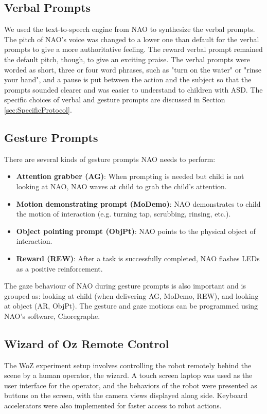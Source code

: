 \subsection{Verbal Prompts}
We used the text-to-speech engine from NAO to synthesize the verbal prompts.  The pitch of NAO's voice was changed to a lower one than default for the verbal prompts to give a more authoritative feeling.  The reward verbal prompt remained the default pitch, though, to give an exciting praise.  The verbal prompts were worded as short, three or four word phrases, such as "turn on the water" or "rinse your hand", and a pause is put between the action and the subject so that the prompts sounded clearer and was easier to understand to children with ASD.  The specific choices of verbal and gesture prompts are discussed in Section \ref{sec:SpecificProtocol}.

\subsection{Gesture Prompts}
There are several kinds of gesture prompts NAO needs to perform:

\begin{itemize}
	\item \textbf{Attention grabber (AG)}:  When prompting is needed but child is not looking at NAO, NAO waves at child to grab the child’s attention.
	\item \textbf{Motion demonstrating prompt (MoDemo)}:  NAO demonstrates to child the motion of interaction (e.g. turning tap, scrubbing, rinsing, etc.).
	\item \textbf{Object pointing prompt (ObjPt)}:  NAO points to the physical object of interaction.
	\item \textbf{Reward (REW)}:  After a task is successfully completed, NAO flashes LEDs as a positive reinforcement.
\end{itemize}

The gaze behaviour of NAO during gesture prompts is also important and is grouped as: looking at child (when delivering AG, MoDemo, REW), and looking at object (AR, ObjPt).  The gesture and gaze motions can be programmed using NAO's software, Choregraphe.

\subsection{Wizard of Oz Remote Control}
The WoZ experiment setup involves controlling the robot remotely behind the scene by a human operator, the wizard.  A touch screen laptop was used as the user interface for the operator, and the behaviors of the robot were presented as buttons on the screen, with the camera views displayed along side.  Keyboard accelerators were also implemented for faster access to robot actions.
